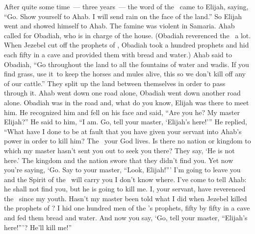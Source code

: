 
\begin{inparaenum}
   After quite some time~--- three years~--- the word of the \lord\ came to Elijah, saying, ``Go. Show yourself to Ahab. I will send rain on the face of the land.''%
   So Elijah went and showed himself to Ahab. The famine was violent in Samaria.%
   Ahab called for Obadiah, who is in charge of the house. (Obadiah reverenced the \lord\ a lot.%
   When Jezebel cut off the prophets of \god, Obadiah took a hundred prophets and hid each fifty in a cave and provided them with bread and water.)%
   Ahab said to Obadiah, ``Go throughout the land to all the fountains of water and wadis. If you find grass, use it\understood{}\ to keep the horses and mules alive, this so we don't kill off any of our cattle.''%
   They split up the land between themselves in order to pass through it. Ahab went down one road alone, Obadiah went down another road alone.%
   Obadiah was in the road and, what do you know, Elijah was there to meet him. He recognized him and fell on his face and said, ``Are you he? My master Elijah?''%
   He said to him, ``I am. Go, tell your master, `Elijah's here!'\thinspace''%
   He replied, ``What have I done to be at fault that you have given your servant into Ahab's power in order to kill him?%
   The \lord\ your God lives. Is there no nation or kingdom to which my master hasn't sent you out to seek you there? They say, `He is not here.' The kingdom and the nation swore that they didn't find you.%
   Yet now you're saying, `Go. Say to your master, ``Look, Elijah!''\thinspace'%
   I'm going to leave you and the Spirit of the \lord\ will carry you I don't know where. I've come to tell Ahab: he shall not find you, but he is going to kill me. I, your servant, have reverenced the \lord\ since my youth.%
   Hasn't my master been told what I did when Jezebel killed the prophets of \god? I hid one hundred men of the \lord's prophets, fifty by fifty in a cave and fed them bread and water.%
   And now you say, `Go, tell your master, ``Elijah's here!''\thinspace'? He'll kill me!''%


\end{inparaenum}
